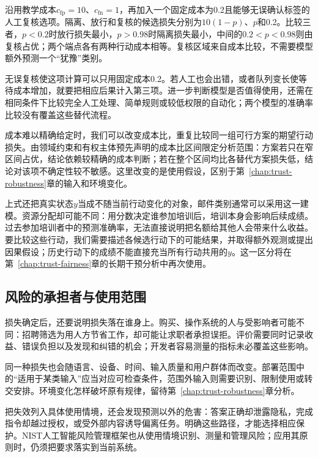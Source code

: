 \begin{example}[增加复核选项后的决策]
\label{ex:trust-review-cost}
沿用教学成本$c_{\mathrm{fp}}=10$、$c_{\mathrm{fn}}=1$，再加入一个固定成本为0.2且能够无误确认标签的人工复核选项。隔离、放行和复核的候选损失分别为$10(1-p)$、$p$和0.2。比较三者，$p<0.2$时放行损失最小，$p>0.98$时隔离损失最小，中间的$0.2<p<0.98$则由复核占优；两个端点各有两种行动成本相等。复核区域来自成本比较，不需要模型额外预测一个“犹豫”类别。
\end{example}

无误复核使这项计算可以只用固定成本0.2。若人工也会出错，或者队列变长使等待成本增加，就要把相应后果计入第三项。进一步判断模型是否值得使用，还需在相同条件下比较完全人工处理、简单规则或较低权限的自动化；两个模型的准确率比较没有覆盖这些替代流程。

成本难以精确给定时，我们可以改变成本比，重复比较同一组可行方案的期望行动损失。由领域约束和有权主体预先声明的成本比区间限定分析范围：方案若只在窄区间占优，结论依赖较精确的成本判断；若在整个区间均比各替代方案损失低，结论对该项不确定性较不敏感。这里改变的是使用假设，区别于第~\ref{chap:trust-robustness}章的输入和环境变化。

上式还把真实状态$y$当成不随当前行动变化的对象，邮件类别通常可以采用这一建模。资源分配却可能不同：用分数决定谁参加培训后，培训本身会影响后续成绩。过去参加培训者中的预测准确率，无法直接说明把名额给其他人会带来什么收益。要比较这些行动，我们需要描述各候选行动下的可能结果，并取得额外观测或提出因果假设；历史行动下的成绩不能直接充当所有行动共用的$y$。这一区分将在第~\ref{chap:trust-fairness}章的长期干预分析中再次使用。

\subsection{风险的承担者与使用范围}

损失确定后，还要说明损失落在谁身上。购买、操作系统的人与受影响者可能不同：招聘筛选为用人方节省工作，却可能让求职者承担误拒。评价需要同时记录收益、错误负担以及发现和纠错的机会；开发者容易测量的指标未必覆盖这些影响。

同一种损失也会随语言、设备、时间、输入质量和用户群体而改变。部署范围中的“适用于某类输入”应当对应可检查条件，范围外输入则需要识别、限制使用或转交安排。环境变化怎样破坏原有规律，留待第~\ref{chap:trust-robustness}章分析。

把失效列入具体使用情境，还会发现预测以外的危害：答案正确却泄露隐私，完成指令却越过授权，或受外部内容诱导偏离任务。明确这些路径，才能选择相应保护。NIST人工智能风险管理框架也从使用情境识别、测量和管理风险；应用其原则时，仍须把要求落实到当前系统。

